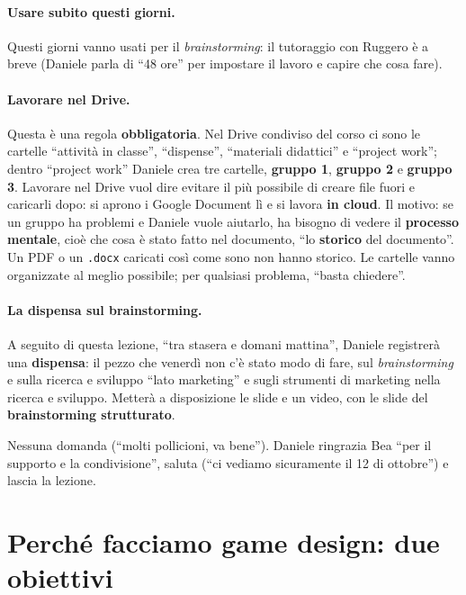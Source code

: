 \paragraph{Usare subito questi giorni.} Questi giorni vanno usati per il
\emph{brainstorming}: il tutoraggio con Ruggero è a breve (Daniele parla di ``48
ore'' per impostare il lavoro e capire che cosa fare).

\paragraph{Lavorare nel Drive.} Questa è una regola \textbf{obbligatoria}. Nel
Drive condiviso del corso ci sono le cartelle ``attività in classe'', ``dispense'',
``materiali didattici'' e ``project work''; dentro ``project work'' Daniele crea
tre cartelle, \textbf{gruppo 1}, \textbf{gruppo 2} e \textbf{gruppo 3}. Lavorare nel
Drive vuol dire evitare il più possibile di creare file fuori e caricarli dopo:
si aprono i Google Document lì e si lavora \textbf{in cloud}. Il motivo: se un
gruppo ha problemi e Daniele vuole aiutarlo, ha bisogno di vedere il
\textbf{processo mentale}, cioè che cosa è stato fatto nel documento, ``lo
\textbf{storico} del documento''. Un PDF o un \texttt{.docx} caricati così come
sono non hanno storico. Le cartelle vanno organizzate al meglio possibile; per
qualsiasi problema, ``basta chiedere''.

\paragraph{La dispensa sul brainstorming.} A seguito di questa lezione, ``tra stasera
e domani mattina'', Daniele registrerà una \textbf{dispensa}: il pezzo che venerdì
non c'è stato modo di fare, sul \emph{brainstorming} e sulla ricerca e sviluppo
``lato marketing'' e sugli strumenti di marketing nella ricerca e sviluppo. Metterà
a disposizione le slide e un video, con le slide del \textbf{brainstorming
strutturato}.

Nessuna domanda (``molti pollicioni, va bene''). Daniele ringrazia Bea ``per il
supporto e la condivisione'', saluta (``ci vediamo sicuramente il 12 di
ottobre'') e lascia la lezione.

\section{Perché facciamo game design: due obiettivi}
\label{a7:sec:obiettivi}

